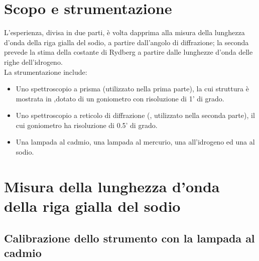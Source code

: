 \section{Scopo e strumentazione}

L'esperienza, divisa in due parti, è volta dapprima alla misura della lunghezza d'onda della riga gialla del sodio, a partire dall'angolo di diffrazione; la seconda prevede la stima della costante di Rydberg a partire dalle lunghezze d'onda delle righe dell'idrogeno.\\ La strumentazione include:
\begin{itemize} 
\item Uno spettroscopio a prisma (utilizzato nella prima parte), la cui struttura è mostrata in ,dotato di un goniometro con risoluzione di 1' di grado.
\item Uno spettroscopio a reticolo di diffrazione (, utilizzato nella seconda parte), il cui goniometro ha risoluzione di 0.5' di grado.
\item Una lampada al cadmio, una lampada al mercurio, una all'idrogeno ed una al sodio.
\end{itemize}



\section{Misura della lunghezza d'onda della riga gialla del sodio}

\subsection{Calibrazione dello strumento con la lampada al cadmio}


